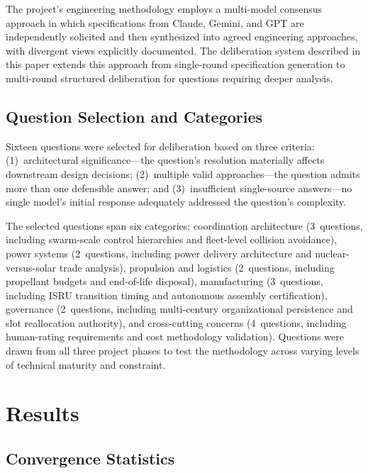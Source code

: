 \documentclass[11pt,a4paper]{article}
\begin{document}
The project's engineering methodology employs a multi-model consensus approach in which specifications from Claude, Gemini, and GPT are independently solicited and then synthesized into agreed engineering approaches, with divergent views explicitly documented. The deliberation system described in this paper extends this approach from single-round specification generation to multi-round structured deliberation for questions requiring deeper analysis.

\subsection{Question Selection and Categories}

Sixteen questions were selected for deliberation based on three criteria: (1)~architectural significance---the question's resolution materially affects downstream design decisions; (2)~multiple valid approaches---the question admits more than one defensible answer; and (3)~insufficient single-source answers---no single model's initial response adequately addressed the question's complexity.

The selected questions span six categories: coordination architecture (3~questions, including swarm-scale control hierarchies and fleet-level collision avoidance), power systems (2~questions, including power delivery architecture and nuclear-versus-solar trade analysis), propulsion and logistics (2~questions, including propellant budgets and end-of-life disposal), manufacturing (3~questions, including ISRU transition timing and autonomous assembly certification), governance (2~questions, including multi-century organizational persistence and slot reallocation authority), and cross-cutting concerns (4~questions, including human-rating requirements and cost methodology validation). Questions were drawn from all three project phases to test the methodology across varying levels of technical maturity and constraint.

\section{Results}
\label{sec:results}

\subsection{Convergence Statistics}
\end{document}
